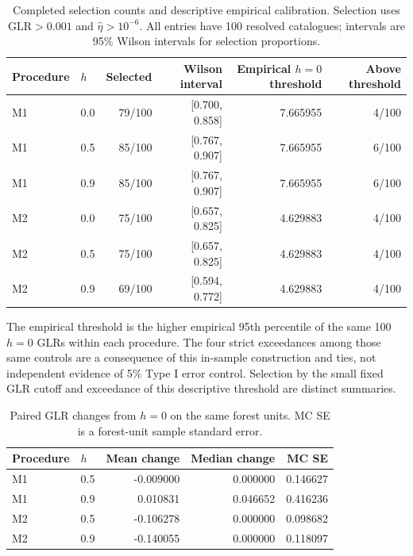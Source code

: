 \begin{table}[htbp]\centering\setlength{\tabcolsep}{5pt}

\caption{Completed selection counts and descriptive empirical calibration. Selection uses $\mathrm{GLR}>0.001$ and $\hat\eta>10^{-6}$. All entries have 100 resolved catalogues; intervals are 95\% Wilson intervals for selection proportions.}\label{tab:s02-completed}

\begin{tabular}{llrrrr}\toprule

Procedure & $h$ & Selected & Wilson interval & Empirical $h=0$ threshold & Above threshold\\\midrule

M1 & 0.0 & 79/100 & [0.700, 0.858] & 7.665955 & 4/100 \\

M1 & 0.5 & 85/100 & [0.767, 0.907] & 7.665955 & 6/100 \\

M1 & 0.9 & 85/100 & [0.767, 0.907] & 7.665955 & 6/100 \\

M2 & 0.0 & 75/100 & [0.657, 0.825] & 4.629883 & 4/100 \\

M2 & 0.5 & 75/100 & [0.657, 0.825] & 4.629883 & 4/100 \\

M2 & 0.9 & 69/100 & [0.594, 0.772] & 4.629883 & 4/100 \\

\bottomrule\end{tabular}\end{table}

The empirical threshold is the higher empirical 95th percentile of the same 100 $h=0$ GLRs within each procedure. The four strict exceedances among those same controls are a consequence of this in-sample construction and ties, not independent evidence of 5\% Type I error control. Selection by the small fixed GLR cutoff and exceedance of this descriptive threshold are distinct summaries.

\begin{table}[htbp]\centering

\caption{Paired GLR changes from $h=0$ on the same forest units. MC SE is a forest-unit sample standard error.}\label{tab:s02-paired}

\begin{tabular}{llrrr}\toprule Procedure & $h$ & Mean change & Median change & MC SE\\\midrule

M1 & 0.5 & -0.009000 & 0.000000 & 0.146627 \\

M1 & 0.9 & 0.010831 & 0.046652 & 0.416236 \\

M2 & 0.5 & -0.106278 & 0.000000 & 0.098682 \\

M2 & 0.9 & -0.140055 & 0.000000 & 0.118097 \\

\bottomrule\end{tabular}\end{table}

